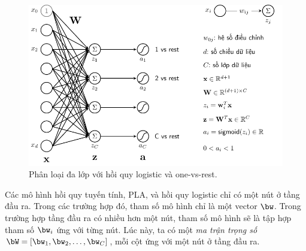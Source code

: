 \begin{figure}[t]
\centering
    \includegraphics[width =
    .8\textwidth]{Chapters/05_NeuralNetworks/13_softmax/latex/onevsrest.pdf}
    \caption[]{Phân loại đa lớp với hồi quy logistic và one-vs-rest.}
    \label{fig:13_1}
\end{figure}
 
 

 
Các mô hình hồi quy tuyến tính, PLA, và hồi quy logistic chỉ có một nút ở tầng
đầu ra. Trong các trường hợp đó, tham số mô hình chỉ là một vector $\bw$.
Trong trường hợp tầng đầu ra có nhiều hơn một nút, tham số mô hình sẽ là tập hợp
tham số $\bw_i$ ứng với từng nút. Lúc này, ta có một \textit{ma trận
trọng số} $\bW = [\bw_1, \bw_2, \dots, \bw_C]$, mỗi
cột ứng với một nút ở tầng đầu ra.
 
